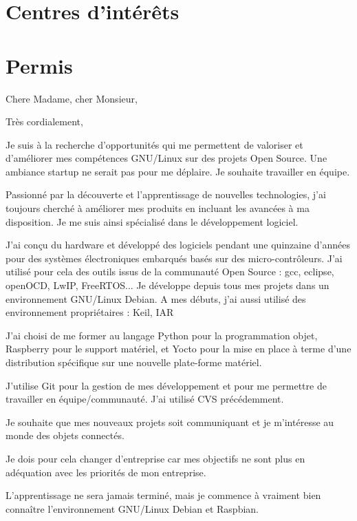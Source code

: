 \documentclass[11pt,a4paper,sans]{moderncv}   %
\begin{document}
\section{Centres d'intérêts}


\renewcommand{\listitemsymbol}{-~}            %

\section{Permis}


\clearpage
\date{4 décembre 2017}
\opening{Chere Madame, cher Monsieur,}
\closing{Très cordialement,}
\makelettertitle

    Je suis à la recherche d'opportunités qui me permettent de valoriser et d'améliorer mes compétences GNU/Linux sur des projets Open Source. Une ambiance startup ne serait pas pour me déplaire. Je souhaite travailler en équipe.
    
    Passionné par la découverte et l'apprentissage de nouvelles technologies, j'ai toujours cherché à améliorer mes produits en incluant les avancées à ma disposition. Je me suis ainsi spécialisé dans le développement logiciel.

    J'ai conçu du hardware et développé des logiciels pendant une quinzaine d'années pour des systèmes électroniques embarqués basés sur des micro-contrôleurs. J'ai utilisé pour cela des outils issus de la communauté Open Source : gcc, eclipse, openOCD, LwIP, FreeRTOS... Je développe depuis tous mes projets dans un environnement GNU/Linux Debian. A mes débuts, j'ai aussi utilisé des environnement propriétaires : Keil, IAR

    J'ai choisi de me former au langage Python pour la programmation objet, Raspberry pour le support matériel, et Yocto pour la mise en place à terme d'une distribution spécifique sur une nouvelle plate-forme matériel.

    J'utilise Git pour la gestion de mes développement et pour me permettre de travailler en équipe/communauté. J'ai utilisé CVS précédemment.

    Je souhaite que mes nouveaux projets soit communiquant et je m'intéresse au monde des objets connectés.
    
    Je dois pour cela changer d'entreprise car mes objectifs ne sont plus en adéquation avec les priorités de mon entreprise. 

    L'apprentissage ne sera jamais terminé, mais je commence à vraiment bien connaître l'environnement GNU/Linux Debian et Raspbian.

\makeletterclosing
\end{document}
